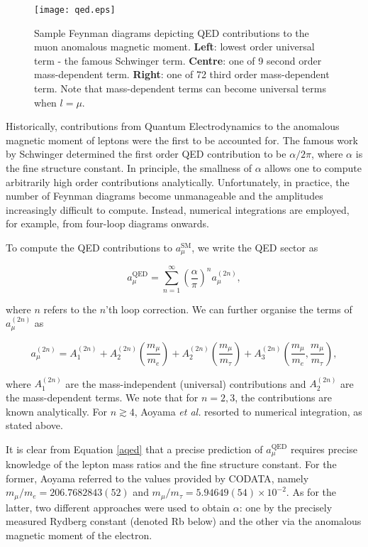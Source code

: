 \documentclass{article}
\numberwithin{equation}{section} %
\begin{document}
\begin{figure}[t]
    \centering
    \texttt{[image: qed.eps]}%
    \caption{Sample Feynman diagrams depicting QED contributions to the muon anomalous magnetic moment. \textbf{Left}: lowest order universal term - the famous Schwinger term. \textbf{Centre}: one of 9 second order mass-dependent term. \textbf{Right}: one of 72 third order mass-dependent term. Note that mass-dependent terms can become universal terms when $l=\mu$.}%
    \label{qedfeynman}%
\end{figure}

Historically, contributions from Quantum Electrodynamics to the anomalous magnetic moment of leptons were the first to be accounted for. The famous work by Schwinger\cite{schwinger} determined the first order QED contribution to be $\alpha/2\pi$, where $\alpha$ is the fine structure constant. In principle, the smallness of $\alpha$ allows one to compute arbitrarily high order contributions analytically. Unfortunately, in practice, the number of Feynman diagrams become unmanageable and the amplitudes increasingly difficult to compute. Instead, numerical integrations are employed, for example, from four-loop diagrams onwards\cite{aoyama}.

To compute the QED contributions to $a_\mu^\mathrm{SM}$, we write the QED sector as

\begin{equation}
a_\mu^\mathrm{QED} = \sum_{n=1}^\infty \left(\frac{\alpha}{\pi}\right)^n a_\mu^{(2n)},
\label{aqed}
\end{equation}

\noindent where $n$ refers to the $n$'th loop correction. We can further organise the terms of $a_\mu^{(2n)}$ as

\begin{equation}
a_\mu^{(2n)} = A_1^{(2n)} + A_2^{(2n)}\left(\frac{m_\mu}{m_e}\right) + A_2^{(2n)}\left(\frac{m_\mu}{m_\tau}\right) + A_3^{(2n)}\left(\frac{m_\mu}{m_e}, \frac{m_\mu}{m_\tau}\right),
\end{equation}

\noindent where $A_1^{(2n)}$ are the mass-independent (universal) contributions and $A_2^{(2n)}$ are the mass-dependent terms. We note that for $n=2,3$, the contributions are known analytically. For $n\gtrsim 4$, Aoyama \textit{et al.} resorted to numerical integration, as stated above. 

It is clear from Equation \ref{aqed} that a precise prediction of $a_\mu^\mathrm{QED}$ requires precise knowledge of the lepton mass ratios and the fine structure constant. For the former, Aoyama referred to the values provided by CODATA\cite{codata}, namely $m_\mu /m_e = 206.7682843(52)$ and $m_\mu /m_\tau = 5.94649(54) \times 10^{-2}$. As for the latter, two different approaches were used to obtain $\alpha$: one by the precisely measured Rydberg constant (denoted Rb below) and the other via the anomalous magnetic moment of the electron. 
\end{document}
